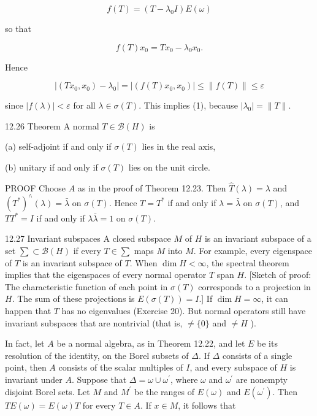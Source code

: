\documentclass[10pt]{article}
\begin{document}
$$
f(T)=\left(T-\lambda_{0} I\right) E(\omega)
$$

so that

$$
f(T) x_{0}=T x_{0}-\lambda_{0} x_{0} .
$$

Hence

$$
\left|\left(T x_{0}, x_{0}\right)-\lambda_{0}\right|=\left|\left(f(T) x_{0}, x_{0}\right)\right| \leq\|f(T)\| \leq \varepsilon
$$

since $|f(\lambda)|<\varepsilon$ for all $\lambda \in \sigma(T)$. This implies (1), because $\left|\lambda_{0}\right|=\|T\|$.

12.26 Theorem A normal $T \in \mathscr{B}(H)$ is

(a) self-adjoint if and only if $\sigma(T)$ lies in the real axis,

(b) unitary if and only if $\sigma(T)$ lies on the unit circle.

PROOF Choose $A$ as in the proof of Theorem 12.23. Then $\hat{T}(\lambda)=\lambda$ and $\left(T^{*}\right)^{\wedge}(\lambda)=\bar{\lambda}$ on $\sigma(T)$. Hence $T=T^{*}$ if and only if $\lambda=\bar{\lambda}$ on $\sigma(T)$, and $T T^{*}=I$ if and only if $\lambda \bar{\lambda}=1$ on $\sigma(T)$.

12.27 Invariant subspaces A closed subspace $M$ of $H$ is an invariant subspace of a set $\sum \subset \mathscr{B}(H)$ if every $T \in \sum$ maps $M$ into $M$. For example, every eigenspace of $T$ is an invariant subspace of $T$. When $\operatorname{dim} H<\infty$, the spectral theorem implies that
the eigenspaces of every normal operator $T$ span $H$. [Sketch of proof: The characteristic function of each point in $\sigma(T)$ corresponds to a projection in $H$. The sum of these projections is $E(\sigma(T))=I$.] If $\operatorname{dim} H=\infty$, it can happen that $T$ has no eigenvalues (Exercise 20). But normal operators still have invariant subspaces that are nontrivial (that is, $\neq\{0\}$ and $\neq H$ ).

In fact, let $A$ be a normal algebra, as in Theorem 12.22, and let $E$ be its resolution of the identity, on the Borel subsets of $\Delta$. If $\Delta$ consists of a single point, then $A$ consists of the scalar multiples of $I$, and every subspace of $H$ is invariant under $A$. Suppose that $\Delta=\omega \cup \omega^{\prime}$, where $\omega$ and $\omega^{\prime}$ are nonempty disjoint Borel sets. Let $M$ and $M^{\prime}$ be the ranges of $E(\omega)$ and $E\left(\omega^{\prime}\right)$. Then $T E(\omega)=E(\omega) T$ for every $T \in A$. If $x \in M$, it follows that
\end{document}

